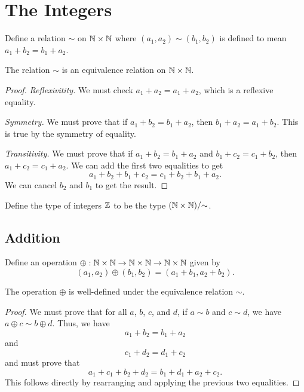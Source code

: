 \documentclass[../../math.tex]{subfiles}
\begin{document}
\setcounter{chapter}{6}

\chapter{The Integers} \label{chap_integer}

\begin{definition}
    Define a relation $\sim$ on $\mathbb{N} \times \mathbb{N}$ where $(a_1, a_2) \sim (b_1,
    b_2)$ is defined to mean $a_1 + b_2 = b_1 + a_2$.
\end{definition}

\begin{lemma}
    The relation $\sim$ is an equivalence relation on $\mathbb{N} \times \mathbb{N}$.
\end{lemma}
\begin{proof}
    \textit{Reflexivitity.}  We must check $a_1 + a_2 = a_1 + a_2$, which is a
    reflexive equality.

    \textit{Symmetry.}  We must prove that if $a_1 + b_2 = b_1 + a_2$, then $b_1
    + a_2 = a_1 + b_2$.  This is true by the symmetry of equality.

    \textit{Transitivity.}  We must prove that if $a_1 + b_2 = b_1 + a_2$ and
    $b_1 + c_2 = c_1 + b_2$, then $a_1 + c_2 = c_1 + a_2$.  We can add the first
    two equalities to get
    \[
        a_1 + b_2 + b_1 + c_2 = c_1 + b_2 + b_1 + a_2.
    \]
    We can cancel $b_2$ and $b_1$ to get the result.
\end{proof}

\begin{definition}
    Define the type of integers $\mathbb{Z}$ to be the type $(\mathbb{N} \times \mathbb{N})/{\sim}$.
\end{definition}

\section{Addition}

\begin{definition}
    Define an operation $\oplus : \mathbb{N} \times \mathbb{N} \to \mathbb{N} \times \mathbb{N} \to \mathbb{N} \times
    \mathbb{N}$ given by
    \[
        (a_1, a_2) \oplus (b_1, b_2) = (a_1 + b_1, a_2 + b_2).
    \]
\end{definition}

\begin{lemma}
    The operation $\oplus$ is well-defined under the equivalence relation
    $\sim$.
\end{lemma}
\begin{proof}
    We must prove that for all $a$, $b$, $c$, and $d$, if $a \sim b$ and $c \sim
    d$, we have $a \oplus c \sim b \oplus d$.  Thus, we have
    \[
        a_1 + b_2 = b_1 + a_2
    \]
    and
    \[
        c_1 + d_2 = d_1 + c_2
    \]
    and must prove that
    \[
        a_1 + c_1 + b_2 + d_2 = b_1 + d_1 + a_2 + c_2.
    \]
    This follows directly by rearranging and applying the previous two
    equalities.
\end{proof}
\end{document}
